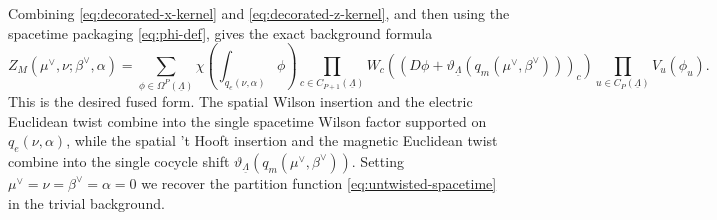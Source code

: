 \documentclass[dvipsnames,a4paper]{article}
\numberwithin{equation}{section}
\theoremstyle{definition}
\theoremstyle{remark}
\begin{document}
Combining \eqref{eq:decorated-x-kernel} and \eqref{eq:decorated-z-kernel}, and then
using the spacetime packaging \eqref{eq:phi-def}, gives the exact background formula
\begin{equation}
	Z_M(\mu^\vee,\nu;\beta^\vee,\alpha)
	=
	\sum_{\phi\in\Omega^P(\underline\Lambda)}
	\chi\left(\int_{q_e(\nu,\alpha)}\phi\right)
	\prod_{c\in C_{P+1}(\underline\Lambda)}
	W_c\left(
	(D\phi+\vartheta_{\underline\Lambda}(q_m(\mu^\vee,\beta^\vee)))_c
	\right)
	\prod_{u\in C_P(\underline\Lambda)}
	V_u(\phi_u).
	\label{eq:decorated-spacetime}
\end{equation}
This is the desired fused form.  The spatial Wilson insertion and the electric Euclidean
twist combine into the single spacetime Wilson factor supported on
\(q_e(\nu,\alpha)\), while the spatial 't Hooft insertion and the magnetic Euclidean twist
combine into the single cocycle shift
\(\vartheta_{\underline\Lambda}(q_m(\mu^\vee,\beta^\vee))\). Setting $\mu^\vee=\nu=\beta^\vee=\alpha=0$ we recover the partition function \eqref{eq:untwisted-spacetime} in the trivial background.




%
%
\printbibliography
	
	
\end{document}
